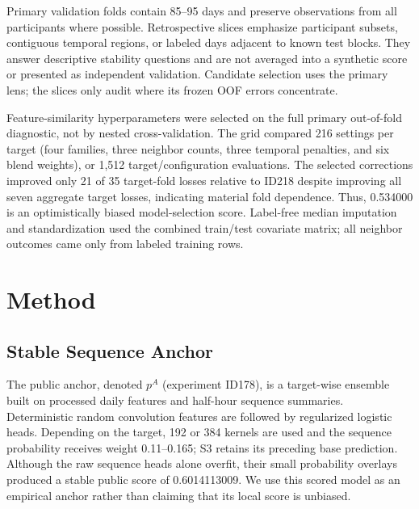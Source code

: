 \documentclass[conference]{IEEEtran}
\begin{document}
Primary validation folds contain 85--95 days and preserve observations from all participants where possible. Retrospective slices emphasize participant subsets, contiguous temporal regions, or labeled days adjacent to known test blocks. They answer descriptive stability questions and are not averaged into a synthetic score or presented as independent validation. Candidate selection uses the primary lens; the slices only audit where its frozen OOF errors concentrate.

Feature-similarity hyperparameters were selected on the full primary out-of-fold diagnostic, not by nested cross-validation. The grid compared 216 settings per target (four families, three neighbor counts, three temporal penalties, and six blend weights), or 1,512 target/configuration evaluations. The selected corrections improved only 21 of 35 target-fold losses relative to ID218 despite improving all seven aggregate target losses, indicating material fold dependence. Thus, 0.534000 is an optimistically biased model-selection score. Label-free median imputation and standardization used the combined train/test covariate matrix; all neighbor outcomes came only from labeled training rows.

\section{Method}
\subsection{Stable Sequence Anchor}
The public anchor, denoted $p^{A}$ (experiment ID178), is a target-wise ensemble built on processed daily features and half-hour sequence summaries. Deterministic random convolution features are followed by regularized logistic heads. Depending on the target, 192 or 384 kernels are used and the sequence probability receives weight 0.11--0.165; S3 retains its preceding base prediction. Although the raw sequence heads alone overfit, their small probability overlays produced a stable public score of 0.6014113009. We use this scored model as an empirical anchor rather than claiming that its local score is unbiased.
\end{document}

